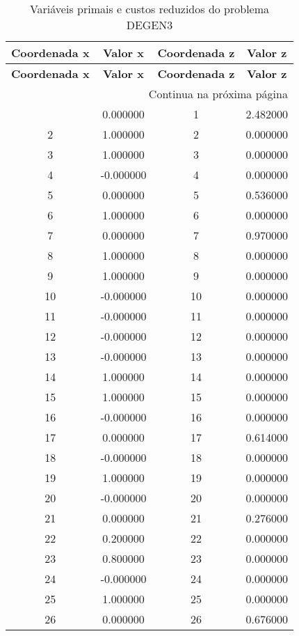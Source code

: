 \documentclass[12pt]{article}
\begin{document}
\begin{longtable}{@{}cccc@{}}
\caption{Variáveis primais e custos reduzidos do problema DEGEN3} \\
\toprule
\textbf{Coordenada x} & \textbf{Valor x} & \textbf{Coordenada z} & \textbf{Valor z} \\
\midrule
\endfirsthead

\toprule
\textbf{Coordenada x} & \textbf{Valor x} & \textbf{Coordenada z} & \textbf{Valor z} \\
\midrule
\endhead

\midrule \multicolumn{4}{r}{{Continua na próxima página}} \\ \midrule
\endfoot

\bottomrule
\endlastfoot
1 & 0.000000 & 1 & 2.482000 \\
2 & 1.000000 & 2 & 0.000000 \\
3 & 1.000000 & 3 & 0.000000 \\
4 & -0.000000 & 4 & 0.000000 \\
5 & 0.000000 & 5 & 0.536000 \\
6 & 1.000000 & 6 & 0.000000 \\
7 & 0.000000 & 7 & 0.970000 \\
8 & 1.000000 & 8 & 0.000000 \\
9 & 1.000000 & 9 & 0.000000 \\
10 & -0.000000 & 10 & 0.000000 \\
11 & -0.000000 & 11 & 0.000000 \\
12 & -0.000000 & 12 & 0.000000 \\
13 & -0.000000 & 13 & 0.000000 \\
14 & 1.000000 & 14 & 0.000000 \\
15 & 1.000000 & 15 & 0.000000 \\
16 & -0.000000 & 16 & 0.000000 \\
17 & 0.000000 & 17 & 0.614000 \\
18 & -0.000000 & 18 & 0.000000 \\
19 & 1.000000 & 19 & 0.000000 \\
20 & -0.000000 & 20 & 0.000000 \\
21 & 0.000000 & 21 & 0.276000 \\
22 & 0.200000 & 22 & 0.000000 \\
23 & 0.800000 & 23 & 0.000000 \\
24 & -0.000000 & 24 & 0.000000 \\
25 & 1.000000 & 25 & 0.000000 \\
26 & 0.000000 & 26 & 0.676000 \\

\end{longtable}
\end{document}
